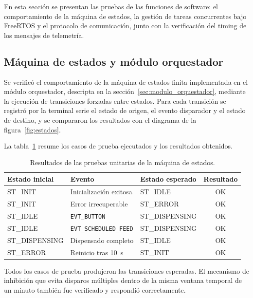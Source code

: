 En esta sección se presentan las pruebas de las funciones de software:
el comportamiento de la máquina de estados, la gestión de tareas concurrentes
bajo FreeRTOS y el protocolo de comunicación, junto con la verificación del timing de los mensajes de telemetría.

\subsection{Máquina de estados y módulo orquestador}

Se verificó el comportamiento de la máquina de estados finita implementada
en el módulo orquestador, descripta en la sección~\ref{sec:modulo_orquestador},
mediante la ejecución de transiciones forzadas entre estados. Para cada
transición se registró por la terminal serie el estado de origen, el evento
disparador y el estado de destino, y se compararon los resultados con el
diagrama de la figura~\ref{fig:estados}.

La tabla~\ref{tab:fsm_prueba} resume los casos de prueba ejecutados y los
resultados obtenidos.

\begin{table}[H]
    \centering
    \caption{Resultados de las pruebas unitarias de la máquina de estados.}
    \label{tab:fsm_prueba}
    \begin{tabular}{>{\ttfamily}p{3.0cm} p{4.3cm} >{\ttfamily}p{3.2cm} c}
        \hline
        \textnormal{\textbf{Estado inicial}} & \textbf{Evento}
        & \textnormal{\textbf{Estado esperado}} & \textbf{Resultado} \\
        \hline
        ST\_INIT & Inicialización exitosa & ST\_IDLE & OK \\
        ST\_INIT & Error irrecuperable & ST\_ERROR & OK \\
        ST\_IDLE & \texttt{EVT\_BUTTON} & ST\_DISPENSING & OK \\
        ST\_IDLE & \texttt{EVT\_SCHEDULED\_FEED} & ST\_DISPENSING & OK \\
        ST\_DISPENSING & Dispensado completo & ST\_IDLE & OK \\
        ST\_ERROR & Reinicio tras 10~s & ST\_INIT & OK \\
        \hline
    \end{tabular}
\end{table}

Todos los casos de prueba produjeron las transiciones esperadas. El mecanismo
de inhibición que evita disparos múltiples dentro de la misma ventana temporal
de un minuto también fue verificado y respondió correctamente.

